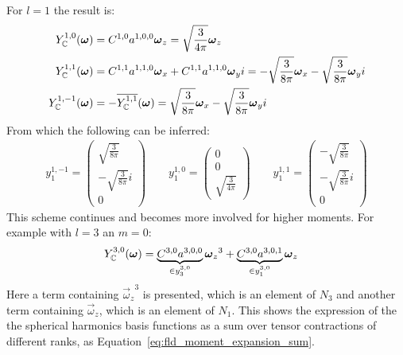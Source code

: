 For $l=1$ the result is:
\begin{align}
Y_{\mathbb{C}}^{1,0}(\boldsymbol{\mathbf{\omega}}) &= C^{{1,0}}a^{{1,0,0}}\boldsymbol{\mathbf{\omega}}_z = \sqrt{\frac{3}{4\pi}}\boldsymbol{\mathbf{\omega}}_z
\\
Y_{\mathbb{C}}^{1,1}(\boldsymbol{\mathbf{\omega}}) &= C^{{1,1}}a^{{1,1,0}}\boldsymbol{\mathbf{\omega}}_x+C^{{1,1}}a^{{1,1,0}}\boldsymbol{\mathbf{\omega}}_yi = -\sqrt{\frac{3}{8\pi}}\boldsymbol{\mathbf{\omega}}_x - \sqrt{\frac{3}{8\pi}}\boldsymbol{\mathbf{\omega}}_yi
\\
Y_{\mathbb{C}}^{1,-1}(\boldsymbol{\mathbf{\omega}}) &= -\overline{Y_{\mathbb{C}}^{1,1}}(\boldsymbol{\mathbf{\omega}})
= \sqrt{\frac{3}{8\pi}}\boldsymbol{\mathbf{\omega}}_x - \sqrt{\frac{3}{8\pi}}\boldsymbol{\mathbf{\omega}}_yi
\end{align}
From which the following can be inferred:
\begin{align}
y^{1,-1}_1 = \begin{pmatrix}\sqrt{\frac{3}{8\pi}}  \\ -\sqrt{\frac{3}{8\pi}}i \\ 0 \end{pmatrix}
\qquad
y^{1,0}_1 = \begin{pmatrix}0  \\ 0 \\ \sqrt{\frac{3}{4\pi}} \end{pmatrix}
\qquad
y^{1,1}_1 = \begin{pmatrix}-\sqrt{\frac{3}{8\pi}}  \\ -\sqrt{\frac{3}{8\pi}}i \\ 0 \end{pmatrix}
\end{align}
This scheme continues and becomes more involved for higher moments. For example with $l=3$ an $m=0$:
\begin{align}
Y_{\mathbb{C}}^{3,0}(\boldsymbol{\mathbf{\omega}}) &= \underbrace{C^{{3,0}}a^{{3,0,0}}}_{\in y^{3,0}_3}{\boldsymbol{\mathbf{\omega}}_z}^{3}+\underbrace{C^{{3,0}}a^{{3,0,1}}}_{\in y^{3,0}_1}\boldsymbol{\mathbf{\omega}}_z
\end{align}
Here a term containing ${\vec{\omega}_z}^{3}$ is presented, which is an element of $N_3$ and another term containing $\vec{\omega}_z$, which is an element of $N_1$. This shows the expression of the the spherical harmonics basis functions as a sum over tensor contractions of different ranks, as Equation~\ref{eq:fld_moment_expansion_sum}.

